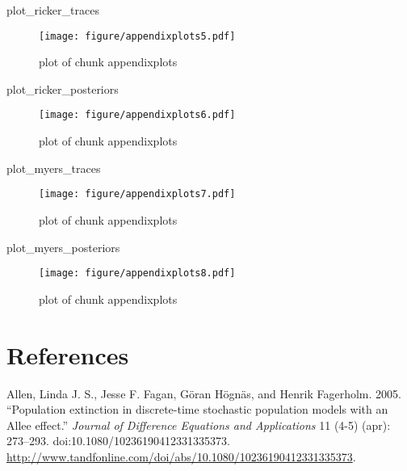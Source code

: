 \documentclass[author-year, review]{elsarticle} %
\makeatletter
\newenvironment{Shaded}{}{}
\newcommand{\NormalTok}[1]{{#1}}
\def\maxwidth{\ifdim\Gin@nat@width>\linewidth\linewidth
\else\Gin@nat@width\fi}
\let\Oldincludegraphics\includegraphics
\renewcommand{\includegraphics}[1]{\Oldincludegraphics[width=\maxwidth]{#1}}
\makeatother
\begin{document}
\begin{Shaded}
\begin{Highlighting}[]
\NormalTok{plot_ricker_traces}
\end{Highlighting}
\end{Shaded}

\begin{figure}[htbp]
\centering
\texttt{[image: figure/appendixplots5.pdf]}
\caption{plot of chunk appendixplots}
\end{figure}

\begin{Shaded}
\begin{Highlighting}[]
\NormalTok{plot_ricker_posteriors}
\end{Highlighting}
\end{Shaded}

\begin{figure}[htbp]
\centering
\texttt{[image: figure/appendixplots6.pdf]}
\caption{plot of chunk appendixplots}
\end{figure}

\begin{Shaded}
\begin{Highlighting}[]
\NormalTok{plot_myers_traces}
\end{Highlighting}
\end{Shaded}

\begin{figure}[htbp]
\centering
\texttt{[image: figure/appendixplots7.pdf]}
\caption{plot of chunk appendixplots}
\end{figure}

\begin{Shaded}
\begin{Highlighting}[]
\NormalTok{plot_myers_posteriors}
\end{Highlighting}
\end{Shaded}

\begin{figure}[htbp]
\centering
\texttt{[image: figure/appendixplots8.pdf]}
\caption{plot of chunk appendixplots}
\end{figure}

\section{References}

Allen, Linda J. S., Jesse F. Fagan, Göran Högnäs, and Henrik Fagerholm.
2005. ``Population extinction in discrete-time stochastic population
models with an Allee effect.'' \emph{Journal of Difference Equations and
Applications} 11 (4-5) (apr): 273--293.
doi:10.1080/10236190412331335373.
\url{http://www.tandfonline.com/doi/abs/10.1080/10236190412331335373}.
\end{document}
